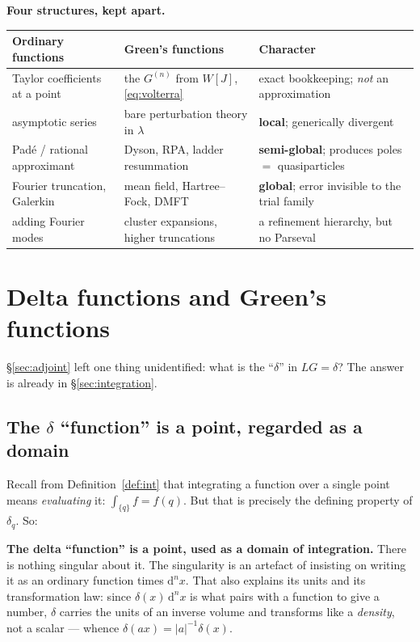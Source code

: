 \documentclass[10pt,a4paper]{article}
\newcommand{\dd}{\mathrm{d}}
\theoremstyle{plain}
\theoremstyle{definition}
\numberwithin{equation}{section}
\begin{document}
\medskip
{}
\noindent\textbf{Four structures, kept apart.}\\[3pt]
{\small
\renewcommand{\arraystretch}{1.2}
\noindent\begin{tabular}{@{}L{0.235\textwidth}L{0.315\textwidth}L{0.335\textwidth}@{}}
\toprule
\textbf{Ordinary functions} & \textbf{Green's functions} & \textbf{Character} \\
\midrule
Taylor coefficients at a point & the $G^{(n)}$ from $W[J]$, \eqref{eq:volterra}
  & exact bookkeeping; \emph{not} an approximation \\
asymptotic series & bare perturbation theory in $\lambda$ & \textbf{local}; generically divergent \\
Pad\'e / rational approximant & Dyson, RPA, ladder resummation
  & \textbf{semi-global}; produces poles $=$ quasiparticles \\
Fourier truncation, Galerkin & mean field, Hartree--Fock, DMFT
  & \textbf{global}; error invisible to the trial family \\
\midrule
adding Fourier modes & cluster expansions, higher truncations
  & a refinement hierarchy, but no Parseval \\
\bottomrule
\end{tabular}}


\section{Delta functions and Green's functions}
\label{sec:green}

\S\ref{sec:adjoint} left one thing unidentified: what is the ``$\delta$'' in $LG=\delta$? The
answer is already in \S\ref{sec:integration}.

\subsection{The $\delta$ ``function'' is a point, regarded as a domain}

Recall from Definition~\ref{def:int} that integrating a function over a single point means
\emph{evaluating} it: $\int_{\{q\}}f=f(q)$. But that is precisely the defining property of
$\delta_q$. So:

\begin{keybox}
\textbf{The delta ``function'' is a point, used as a domain of integration.} There is nothing
singular about it. The singularity is an artefact of insisting on writing it as an ordinary
function times $\dd^nx$. That also explains its units and its transformation law: since
$\delta(x)\,\dd^nx$ is what pairs with a function to give a number, $\delta$ carries the units
of an inverse volume and transforms like a \emph{density}, not a scalar --- whence
$\delta(ax)=|a|^{-1}\delta(x)$.
\end{keybox}
\end{document}
